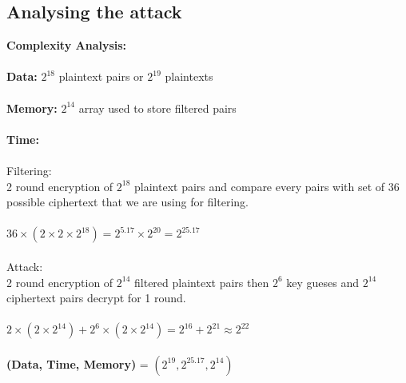\documentclass[journal=tosc,preprint]{iacrtrans}
\begin{document}
\subsection{Analysing the attack}
\textbf{Complexity Analysis:}\\\\
\textbf{Data:} $2^{18}$ plaintext pairs or $2^{19}$ plaintexts\\\\
\textbf{Memory:} $2^{14}$ array used to store filtered pairs\\\\
\textbf{Time:} \\\\ 
Filtering: \\
2 round encryption of $2^{18}$ plaintext pairs and compare every pairs with set of 36 possible ciphertext that we are using for filtering. \\\\
$36 \times ({2 \times 2 \times 2^{18}}) = 2^{5.17} \times 2^{20} = 2^{25.17}$\\\\
Attack:\\
2 round encryption of $2^{14}$ filtered plaintext pairs  then $2^{6}$ key gueses and $2^{14}$  ciphertext pairs decrypt for 1 round.\\\\
$2 \times (2 \times 2^{14}) + 2^6 \times (2 \times 2^{14}) = 2^{16} + 2^{21} \approx 2^{22} $\\\\
\textbf{(Data, Time, Memory)} = $(2^{19},2^{25.17},2^{14})$\\\\\\
\end{document}
